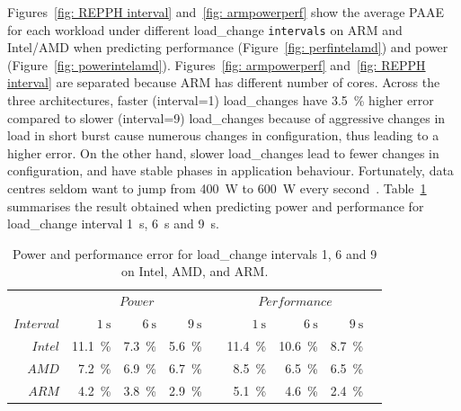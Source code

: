 Figures~\ref{fig: REPPH interval} and~\ref{fig: armpowerperf} show the average PAAE for
each workload under different load\_change \texttt{intervals} on ARM and Intel/AMD when
predicting performance (Figure~\ref{fig: perfintelamd}) and power (Figure~\ref{fig:
powerintelamd}). Figures~\ref{fig: armpowerperf} and~\ref{fig: REPPH interval} are
separated because ARM has different number of cores. Across the three architectures,
faster (interval=1) load\_changes have \SI{3.5}{\percent} higher error compared to slower
(interval=9) load\_changes because of aggressive changes in load in short burst cause
numerous changes in configuration, thus leading to a higher error. On the other hand,
slower load\_changes lead to fewer changes in configuration, and have stable phases in
application behaviour.  Fortunately, data centres seldom want to jump from \SI{400}{\watt}
to \SI{600}{\watt} every second~\citep{6008553, Su:2014:POP:2742155.2742200}.
Table~\ref{tab: summarytable} summarises the result obtained when predicting power and
performance for load\_change interval \SI{1}{\second}, \SI{6}{\second} and
\SI{9}{\second}.

\begin{table}[ht]
\centering
\caption[Average PAAE for load\_change intervals]{ Power and performance error for load\_change intervals 1, 6 and 9 on Intel, AMD, and ARM.}
\begin{tabular}{@{}rrrrcrrrc@{}}\toprule
& \multicolumn{3}{c}{$Power$} & \phantom{abc}& \multicolumn{3}{c}{$Performance$} & \phantom{abc} \\
\cmidrule{2-4} \cmidrule{6-8} 
    $Interval$ & $\SI{1}{\second}$ & $\SI{6}{\second}$ & $\SI{9}{\second}$ && $\SI{1}{\second}$ & $\SI{6}{\second}$ & $\SI{9}{\second}$ \\ 
\midrule
    $Intel$     & \SI{11.1}{\percent} & \SI{7.3}{\percent}    & \SI{5.6}{\percent}  && \SI{11.4}{\percent} & \SI{10.6}{\percent}   & \SI{8.7}{\percent} \\
    $AMD$       & \SI{7.2}{\percent}  & \SI{6.9}{\percent}    & \SI{6.7}{\percent}  && \SI{8.5}{\percent}  & \SI{6.5}{\percent}    & \SI{6.5}{\percent} \\
    $ARM$       & \SI{4.2}{\percent} & \SI{3.8}{\percent}     & \SI{2.9}{\percent}  && \SI{5.1}{\percent}  & \SI{4.6}{\percent}    & \SI{2.4}{\percent} \\
\bottomrule
\end{tabular}
\label{tab: summarytable}
\end{table}

